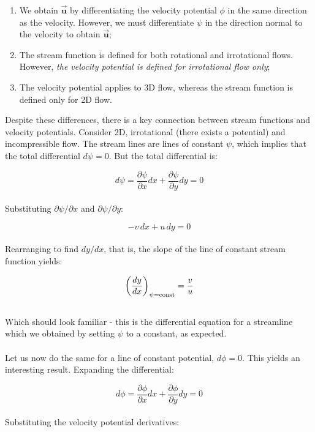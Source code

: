 \documentclass[11pt]{article}
\begin{document}
\begin{enumerate}
    \item We obtain $\vec{\bm{u}}$ by differentiating the velocity potential $\phi$ in the same direction as the velocity. However, we must differentiate $\psi$ in the direction normal to the velocity to obtain $\vec{\bm{u}}$;
    \item The stream function is defined for both rotational and irrotational flows. However, \emph{the velocity potential is defined for irrotational flow only};
    \item The velocity potential applies to 3D flow, whereas the stream function is defined only for 2D flow.
\end{enumerate}
\noindent
Despite these differences, there is a key connection between stream functions and velocity potentials. Consider 2D, irrotational (there exists a potential) and incompressible flow. The stream lines are lines of constant $\psi$, which implies that the total differential $d\psi = 0$. But the total differential is:

\begin{equation*}
    d\psi = \frac{\partial \psi}{\partial x}dx + \frac{\partial \psi}{\partial y}dy = 0
\end{equation*}\\
\noindent
Substituting $\partial \psi / \partial x$ and $\partial \psi / \partial y$:

\begin{equation*}
    -v\,dx + u\,dy = 0
\end{equation*}\\
\noindent
Rearranging to find $dy/dx$, that is, the slope of the line of constant stream function yields:

\begin{equation*}
    \left( \frac{dy}{dx} \right)_{\psi = \textnormal{const}} = \frac{v}{u}
\end{equation*}\\
\noindent
Which should look familiar - this is the differential equation for a streamline which we obtained by setting $\psi$ to a constant, as expected.\\ \\
\noindent
Let us now do the same for a line of constant potential, $d\phi = 0$. This yields an interesting result. Expanding the differential:

\begin{equation*}
    d\phi = \frac{\partial \phi}{\partial x}dx + \frac{\partial \phi}{\partial y}dy = 0
\end{equation*} \\ 
\noindent
Substituting the velocity potential derivatives:
\end{document}
